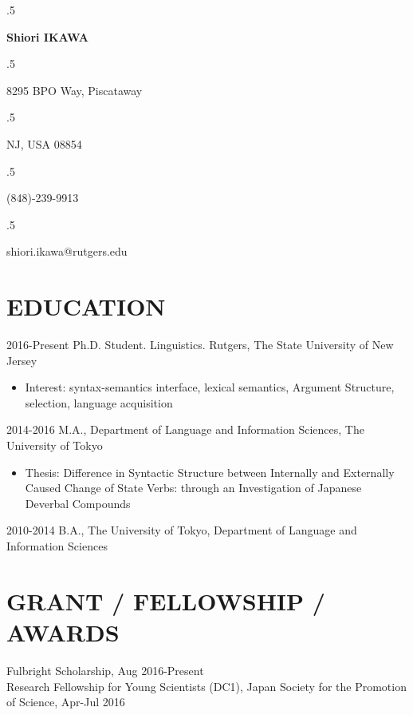 \documentclass[margin, 12pt]{article} %
\begin{document}

\moveleft.5\hoffset\centerline{\large\bf Shiori IKAWA} %
 

\moveleft.5\hoffset\centerline{8295 BPO Way, Piscataway} %
\moveleft.5\hoffset\centerline{NJ, USA 08854}
\moveleft.5\hoffset\centerline{(848)-239-9913}
\moveleft.5\hoffset\centerline{shiori.ikawa@rutgers.edu}

\parindent=0pt


 
\section*{EDUCATION}  


2016-Present Ph.D. Student. Linguistics. Rutgers, The State University of New Jersey
\begin{itemize}
\item
Interest: syntax-semantics interface, lexical semantics, Argument Structure, selection, language acquisition

\end{itemize}
2014-2016 M.A., Department of Language and Information Sciences, The University of Tokyo
\begin{itemize}
\item Thesis: Difference in Syntactic Structure between Internally and Externally Caused Change of State Verbs: through an Investigation of Japanese Deverbal Compounds
\end{itemize}


2010-2014 B.A., The University of Tokyo, Department of Language and Information Sciences

\section*{GRANT / FELLOWSHIP / AWARDS}

Fulbright Scholarship, Aug 2016-Present\\

Research Fellowship for Young Scientists (DC1), Japan Society for the Promotion of Science, Apr-Jul 2016\\
\end{document}
